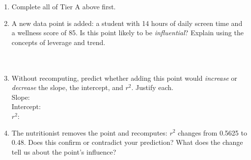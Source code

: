 \documentclass[10pt]{article}
\begin{document}
\begin{tcolorbox}[colback=greenbg, colframe=black!40, boxrule=0.7pt, arc=2mm,
    left=4mm, right=4mm, top=2.5mm, bottom=2.5mm,
    title={\textbf{Tier E --- Extension}}, fonttitle=\bfseries]
\small

\begin{enumerate}[leftmargin=1.6em, itemsep=0.16in]
  \item Complete all of Tier A above first.

  \item A new data point is added: a student with 14 hours of daily screen time and a wellness
        score of 85. Is this point likely to be \textit{influential}? Explain using the concepts
        of leverage and trend.\\[8pt]
        \writeline\\[3pt]\writeline\\[3pt]\writeline

  \item Without recomputing, predict whether adding this point would \textit{increase} or
        \textit{decrease} the slope, the intercept, and $r^2$. Justify each.\\[8pt]
        Slope: \writeline\\[3pt]
        Intercept: \writeline\\[3pt]
        $r^2$: \writeline\\[3pt]\writeline

  \item The nutritionist removes the point and recomputes: $r^2$ changes from 0.5625 to 0.48.
        Does this confirm or contradict your prediction? What does the change tell us about the
        point's influence?\\[8pt]
        \writeline\\[3pt]\writeline\\[3pt]\writeline
\end{enumerate}
\end{tcolorbox}
\end{document}
